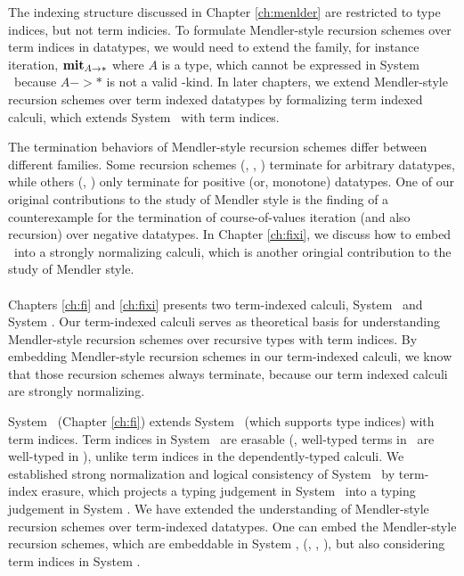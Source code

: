 The indexing structure discussed in Chapter \ref{ch:menlder} are restricted
to type indices, but not term indicies. To formulate Mendler-style recursion
schemes over term indices in datatypes, we would need to extend the family,
for instance iteration, $\mathbf{mit}_{A -> *}$ where $A$ is a type, which cannot
be expressed in System \Fw\ because $A -> *$ is not a valid \Fw-kind.
In later chapters, we extend Mendler-style recursion schemes over
term indexed datatypes by formalizing term indexed calculi, which extends
System \Fw\ with term indices.

The termination behaviors of Mendler-style recursion schemes differ between
different families. Some recursion schemes (\MIt, \MPr, \MsfIt) terminate
for arbitrary datatypes, while others (\McvPr, \McvIt) only terminate for
positive (or, monotone) datatypes. One of our original contributions to
the study of Mendler style is the finding of a counterexample for
the termination of course-of-values iteration (and also recursion) over 
negative datatypes. In Chapter \ref{ch:fixi}, we discuss how to embed
\McvPr\ into a strongly normalizing calculi, which is another oringial
contribution to the study of Mendler style.

\paragraph{}
Chapters \ref{ch:fi} and \ref{ch:fixi} presents two term-indexed calculi,
System \Fi\ and System \Fixi. Our term-indexed calculi serves as
theoretical basis for understanding Mendler-style recursion schemes
over recursive types with term indices.
By embedding Mendler-style recursion schemes in our term-indexed calculi,
we know that those recursion schemes always terminate, because our term
indexed calculi are strongly normalizing.

System \Fi\ (Chapter \ref{ch:fi}) extends System \Fw\ (which supports
type indices) with term indices.  Term indices in System \Fi\ are erasable
(\ie, well-typed terms in \Fi\ are well-typed in \Fw), unlike
term indices in the dependently-typed calculi. We established
strong normalization and logical consistency of System \Fi\ by
term-index erasure, which projects a typing judgement in System \Fi\ into
a typing judgement in System \Fw. We have extended the understanding of
Mendler-style recursion schemes over term-indexed datatypes. One can embed
the Mendler-style recursion schemes, which are embeddable in System \Fw,
(\eg, \MIt, \MsfIt), but also considering term indices in System \Fi.

